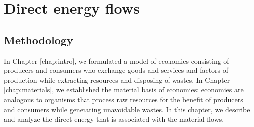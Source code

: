 %
%
%
\chapter{Direct energy flows}
\label{chap:direct_energy} 




\section{Methodology}
\label{sec:energy_methodology}

In Chapter \ref{chap:intro}, we formulated a model of economies
consisting of producers and consumers who exchange
goods and services and factors of production 
while extracting resources and disposing of wastes. 
In Chapter \ref{chap:materials}, we established the material basis of economies: 
economies are analogous to organisms that process raw resources
for the benefit of producers and consumers while generating unavoidable wastes.
In this chapter, we describe and analyze the direct energy that is associated 
with the material flows.

